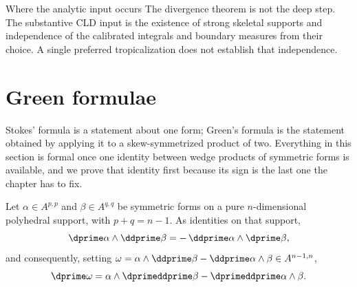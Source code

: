 \begin{warning}{Where the analytic input occurs}
The divergence theorem is not the deep step.  The substantive CLD input is
the existence of strong skeletal supports and independence of the
calibrated integrals and boundary measures from their choice.  A single
preferred tropicalization does not establish that independence.
\end{warning}

\section{Green formulae}
\label{sec:ch11-green}

Stokes' formula is a statement about one form; Green's formula is the
statement obtained by applying it to a skew-symmetrized product of two.
Everything in this section is formal once one identity between wedge
products of symmetric forms is available, and we prove that identity first
because its sign is the last one the chapter has to fix.

\begin{lemma}
\label{lem:ch11-mixed-cancellation}
Let $\alpha\in A^{p,p}$ and $\beta\in A^{q,q}$ be symmetric forms on a
pure $n$-dimensional polyhedral support, with $p+q=n-1$.  As identities
on that support,
\[
 \dprime\alpha\wedge\ddprime\beta
 =-\,\ddprime\alpha\wedge\dprime\beta ,
\]
and consequently, setting
$\omega=\alpha\wedge\ddprime\beta-\ddprime\alpha\wedge\beta\in A^{n-1,n}$,
\[
 \dprime\omega
 =\alpha\wedge\dprimeddprime\beta-\dprimeddprime\alpha\wedge\beta .
\]
\end{lemma}

